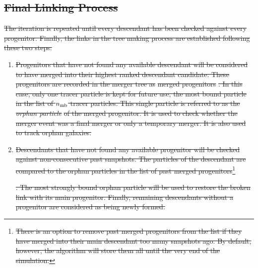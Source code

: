 \documentclass[a4paper,twocolumn,fleqn,usenatbib]{mnras}
\providecommand{\DIFdel}[1]{{\protect\color{red}\sout{#1}}}                      %
\providecommand{\DIFdelbegin}{} %
\newcommand{\DIFscaledelfig}{0.5}
\newlength{\DIFdelgraphicswidth} %
\newlength{\DIFdelgraphicsheight} %
\newcommand{\DIFdelincludegraphics}[2][]{%
\sbox{\DIFdelgraphicsbox}{\DIFOincludegraphics[#1]{#2}}%
\settoboxwidth{\DIFdelgraphicswidth}{\DIFdelgraphicsbox} %
\settoboxtotalheight{\DIFdelgraphicsheight}{\DIFdelgraphicsbox} %
\scalebox{\DIFscaledelfig}{%
\parbox[b]{\DIFdelgraphicswidth}{\usebox{\DIFdelgraphicsbox}\\[-\baselineskip] \rule{\DIFdelgraphicswidth}{0em}}\llap{\resizebox{\DIFdelgraphicswidth}{\DIFdelgraphicsheight}{%
\setlength{\unitlength}{\DIFdelgraphicswidth}%
\begin{picture}(1,1)%
\thicklines\linethickness{2pt} %
{\color[rgb]{1,0,0}\put(0,0){\framebox(1,1){}}}%
{\color[rgb]{1,0,0}\put(0,0){\line( 1,1){1}}}%
{\color[rgb]{1,0,0}\put(0,1){\line(1,-1){1}}}%
\end{picture}%
}\hspace*{3pt}}} %
} %
\DeclareRobustCommand{\DIFdelbegin}{\DIFOdelbegin \let\includegraphics\DIFdelincludegraphics} %
\begin{document}
    \DIFdelbegin \subsection{\DIFdel{Final Linking Process}}
\addtocounter{subsection}{-1}%

\DIFdel{The iteration is repeated until every descendant has been checked
against every progenitor. Finally, the links in the tree making
process are established following these two steps:
}%

\begin{enumerate}%

\item %
\DIFdel{Progenitors that have not found any available descendant will be
  considered to have merged into their highest ranked descendant
  candidate.  These progenitors are recorded in the merger tree as
  }%
\DIFdel{merged progenitors}%
\DIFdel{.  In this case, only one tracer particle is
  kept for future use, the most bound particle in the list of $n_{\rm
    mb}$ tracer particles.  This single particle is referred to as the
  }\emph{\DIFdel{orphan particle}} %
\DIFdel{of the merged progenitor.  It is used to
  check whether the merger event was a final merger or only a
  temporary merger. It is also used to track orphan galaxies.
}%

\item %
\DIFdel{Descendants that have not found any available progenitor will be
  checked against non-consecutive past snapshots. The particles of the
  descendant are compared to the orphan particles in the list of past
  merged progenitors}\footnote{\DIFdel{There is an option to remove past merged
  progenitors from the list if they have merged into their main
  descendant too many snapshots ago.  By default, however, the
  algorithm will store them all until the very end of the
  simulation.}}%
\addtocounter{footnote}{-1}%
\DIFdel{.  The most strongly bound orphan particle will be used
  to restore the broken link with its main progenitor.  Finally,
  remaining descendants without a progenitor are considered as being
  newly formed.
}%


\end{enumerate}%
\end{document}
